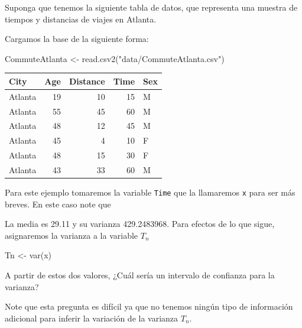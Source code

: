 \documentclass[
  12pt,
]{book}
\newenvironment{Shaded}{\begin{snugshade}}{\end{snugshade}}
\newcommand{\FunctionTok}[1]{\textcolor[rgb]{0.00,0.00,0.00}{#1}}
\newcommand{\NormalTok}[1]{#1}
\newcommand{\OtherTok}[1]{\textcolor[rgb]{0.56,0.35,0.01}{#1}}
\newcommand{\SpecialCharTok}[1]{\textcolor[rgb]{0.00,0.00,0.00}{#1}}
\newcommand{\StringTok}[1]{\textcolor[rgb]{0.31,0.60,0.02}{#1}}
\begin{document}
Suponga que tenemos la siguiente tabla de datos, que representa una
muestra de tiempos y distancias de viajes en Atlanta.

Cargamos la base de la siguiente forma:

\begin{Shaded}
\begin{Highlighting}[]
\NormalTok{CommuteAtlanta }\OtherTok{\textless{}{-}} \FunctionTok{read.csv2}\NormalTok{(}\StringTok{"data/CommuteAtlanta.csv"}\NormalTok{)}
\end{Highlighting}
\end{Shaded}

\begin{longtable}[]{@{}lrrrl@{}}
\toprule()
City & Age & Distance & Time & Sex \\
\midrule()
\endhead
Atlanta & 19 & 10 & 15 & M \\
Atlanta & 55 & 45 & 60 & M \\
Atlanta & 48 & 12 & 45 & M \\
Atlanta & 45 & 4 & 10 & F \\
Atlanta & 48 & 15 & 30 & F \\
Atlanta & 43 & 33 & 60 & M \\
\bottomrule()
\end{longtable}

Para este ejemplo tomaremos la variable \texttt{Time} que la llamaremos
\texttt{x} para ser más breves. En este caso note que

\begin{Shaded}
\end{Shaded}

La media es 29.11 y su varianza 429.2483968. Para efectos de lo que
sigue, asignaremos la varianza a la variable \(T_n\)

\begin{Shaded}
\begin{Highlighting}[]
\NormalTok{Tn }\OtherTok{\textless{}{-}} \FunctionTok{var}\NormalTok{(x)}
\end{Highlighting}
\end{Shaded}

A partir de estos dos valores, ¿Cuál sería un intervalo de confianza
para la varianza?

Note que esta pregunta es difícil ya que no tenemos ningún tipo de
información adicional para inferir la variación de la varianza \(T_n\).
\end{document}
